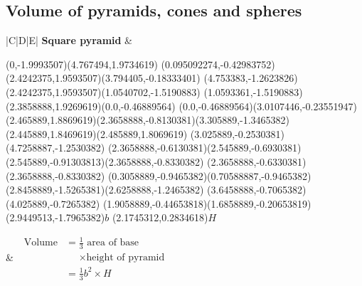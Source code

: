 \subsection{Volume of pyramids, cones and spheres}


\begin{table}[H]
\begin{tabular}{|C|D|E|}
\hline
\textbf{Square pyramid}
&
\begin{center}
\scalebox{1} %
{
\scalebox{1} %
{
\begin{pspicture}(0,-1.9993507)(4.767494,1.9734619)
\pspolygon[linewidth=0.028222222,fillstyle=solid](0.095092274,-0.42983752)(2.4242375,1.9593507)(3.794405,-0.18333401)
\pspolygon[linewidth=0.028222222,fillstyle=solid](4.753383,-1.2623826)(2.4242375,1.9593507)(1.0540702,-1.5190883)
\pspolygon[linewidth=0.028222222,fillstyle=solid](1.0593361,-1.5190883)(2.3858888,1.9269619)(0.0,-0.46889564)
\psline[linewidth=0.022cm,linestyle=dashed,dash=0.16cm 0.16cm](0.0,-0.46889564)(3.0107446,-0.23551947)
\psline[linewidth=0.027999999,linestyle=dotted,dotsep=0.16cm](2.465889,1.8869619)(2.3658888,-0.8130381)(3.305889,-1.3465382)(2.445889,1.8469619)(2.485889,1.8069619)
\psline[linewidth=0.024cm,linestyle=dashed,dash=0.16cm 0.16cm](3.025889,-0.2530381)(4.7258887,-1.2530382)
\psline[linewidth=0.02](2.3658888,-0.6130381)(2.545889,-0.6930381)(2.545889,-0.91303813)(2.3658888,-0.8330382)
\psline[linewidth=0.02cm](2.3658888,-0.6330381)(2.3658888,-0.8330382)
\psline[linewidth=0.04cm](0.3058889,-0.9465382)(0.70588887,-0.9465382)
\psline[linewidth=0.04cm](2.8458889,-1.5265381)(2.6258888,-1.2465382)
\psline[linewidth=0.04cm](3.6458888,-0.7065382)(4.025889,-0.7265382)
\psline[linewidth=0.04cm](1.9058889,-0.44653818)(1.6858889,-0.20653819)
\rput(2.9449513,-1.7965382){$b$}
\rput(2.1745312,0.2834618){$H$}
\end{pspicture} 
}

}
\end{center} 
&
$\begin{aligned}
\mbox{ Volume} &=  \frac{1}{3} \mbox{ area of base}\\
&~~~~~~\times \mbox{height of pyramid }\\
&=\frac{1}{3} b^{2} \times H
 \end{aligned}$
\\ \hline



\end{tabular}
\end{table}
